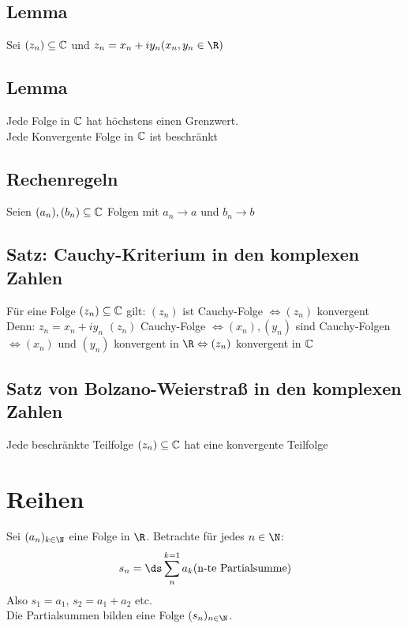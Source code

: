 \section{Lemma}
Sei $(z_n)\subseteq \text{$\mathbb{C}$}$ und $z_n = x_n + iy_n (x_n, y_n \in \R)$
\section{Lemma}
Jede Folge in $\text{$\mathbb{C}$}$ hat höchstens einen Grenzwert.\\
Jede Konvergente Folge in $\text{$\mathbb{C}$}$ ist beschränkt
\section{Rechenregeln}
Seien $(a_n), (b_n) \subseteq \text{$\mathbb{C}$}$ Folgen mit $a_n \to a$ und $b_n \to b$
\section{Satz: Cauchy-Kriterium in den komplexen Zahlen}
Für eine Folge $(z_n) \subseteq \text{$\mathbb{C}$}$ gilt: $(z_n)$ ist Cauchy-Folge $\Leftrightarrow (z_n)$ konvergent\\
Denn: $z_n = x_n + iy_n$ $(z_n)$ Cauchy-Folge $\Leftrightarrow (x_n), (y_n)$ sind Cauchy-Folgen $\Leftrightarrow (x_n)$ und $(y_n)$ konvergent in $\R \Leftrightarrow (z_n)$ konvergent in $\text{$\mathbb{C}$}$
\section{Satz von Bolzano-Weierstraß in den komplexen Zahlen}
Jede beschränkte Teilfolge $(z_n) \subseteq \text{$\mathbb{C}$}$ hat eine konvergente Teilfolge
\chapter{Reihen}
Sei $(a_n)_{k\in\N}$ eine Folge in $\R$. Betrachte für jedes $n \in \N$:
$$s_n = \ds\sum_{n}^{k = 1} a_k (\text{n-te Partialsumme})$$
Also $s_1 = a_1$, $s_2 = a_1 + a_2$ etc.\\
Die Partialsummen bilden eine Folge $(s_n)_{n\in\N}$.
